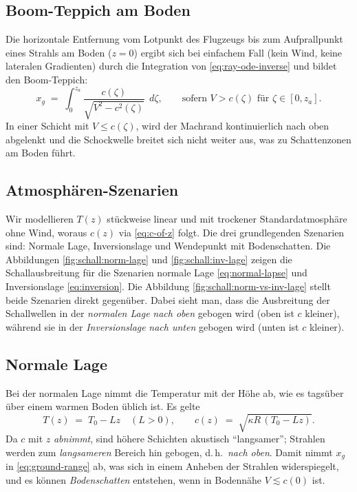 \subsection{Boom-Teppich am Boden}
Die horizontale Entfernung vom Lotpunkt des Flugzeugs bis zum
Aufprallpunkt eines Strahls am Boden ($z=0$) ergibt sich bei einfachem
Fall (kein Wind, keine lateralen Gradienten) durch die
Integration von \eqref{eq:ray-ode-inverse} und bildet den Boom-Teppich:
\begin{equation}
    \quad
    x_g \;=\; \int_{0}^{z_a} \frac{c(\zeta)}{\sqrt{V^2 - c^2(\zeta)}}\;\, d\zeta,
    \qquad \text{sofern } V>c(\zeta) \text{ für } \zeta\in[0,z_a].
    \quad
    \label{eq:ground-range}
\end{equation}
In einer Schicht mit $V\le c(\zeta)$, wird der Machrand kontinuierlich
nach oben abgelenkt und die Schockwelle breitet sich nicht weiter aus,
was zu Schattenzonen am Boden führt.

\subsection{Atmosphären-Szenarien}\label{schall:subsection:atmos-scenarios}
Wir modellieren $T(z)$ stückweise linear und mit trockener
Standardatmosphäre ohne Wind, woraus $c(z)$ via \eqref{eq:c-of-z} folgt.
Die drei grundlegenden Szenarien sind: Normale Lage, Inversionslage und
Wendepunkt mit Bodenschatten.
Die Abbildungen \ref{fig:schall:norm-lage} und \ref{fig:schall:inv-lage}
zeigen die Schallausbreitung für die Szenarien normale Lage
\eqref{eq:normal-lapse} und Inversionslage \eqref{eq:inversion}.
Die Abbildung \ref{fig:schall:norm-vs-inv-lage} stellt beide Szenarien
direkt gegenüber.
Dabei sieht man, dass die Ausbreitung der Schallwellen
in der \emph{normalen Lage} \emph{nach oben} gebogen wird (oben ist $c$ kleiner),
während sie in der \emph{Inversionslage} \emph{nach unten} gebogen wird (unten ist $c$ kleiner).

\subsection*{Normale Lage}
Bei der normalen Lage nimmt die Temperatur mit der Höhe ab,
wie es tagsüber über einem warmen Boden üblich ist.
Es gelte
\begin{equation}
    T(z) \;=\; T_0 - Lz \quad (L>0),
    \qquad
    c(z) \;=\; \sqrt{\kappa R\,(T_0 - Lz)} .
    \label{eq:normal-lapse}
\end{equation}
Da $c$ mit $z$ \emph{abnimmt}, sind höhere Schichten akustisch
``langsamer''; Strahlen werden zum \emph{langsameren} Bereich hin
gebogen, d.\,h.\ \emph{nach oben}.
Damit nimmt $x_g$ in \eqref{eq:ground-range} ab, was sich in einem Anheben
der Strahlen widerspiegelt, und es können \emph{Bodenschatten}
entstehen, wenn in Bodennähe $V\lesssim c(0)$ ist.

